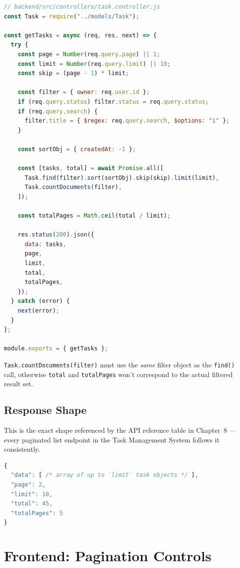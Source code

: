 \begin{lstlisting}[language=JavaScript]
// backend/src/controllers/task.controller.js
const Task = require("../models/Task");

const getTasks = async (req, res, next) => {
  try {
    const page = Number(req.query.page) || 1;
    const limit = Number(req.query.limit) || 10;
    const skip = (page - 1) * limit;

    const filter = { owner: req.user.id };
    if (req.query.status) filter.status = req.query.status;
    if (req.query.search) {
      filter.title = { $regex: req.query.search, $options: "i" };
    }

    const sortObj = { createdAt: -1 };

    const [tasks, total] = await Promise.all([
      Task.find(filter).sort(sortObj).skip(skip).limit(limit),
      Task.countDocuments(filter),
    ]);

    const totalPages = Math.ceil(total / limit);

    res.status(200).json({
      data: tasks,
      page,
      limit,
      total,
      totalPages,
    });
  } catch (error) {
    next(error);
  }
};

module.exports = { getTasks };
\end{lstlisting}

\begin{notebox}[NOTE]
\texttt{Task.countDocuments(filter)} must use the \emph{same} filter object
as the \texttt{find()} call, otherwise \texttt{total} and \texttt{totalPages}
won't correspond to the actual filtered result set.
\end{notebox}

\subsection{Response Shape}

This is the exact shape referenced by the API reference table in
Chapter~8 --- every paginated list endpoint in the Task Management System
follows it consistently.

\begin{lstlisting}[language=JavaScript]
{
  "data": [ /* array of up to `limit` task objects */ ],
  "page": 2,
  "limit": 10,
  "total": 45,
  "totalPages": 5
}
\end{lstlisting}

\section{Frontend: Pagination Controls}

